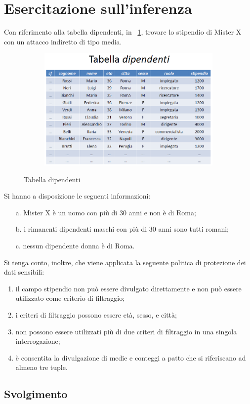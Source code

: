 \section{Esercitazione sull'inferenza}
Con riferimento alla tabella dipendenti, in \figurename ~\ref{fig:Tabella_dipendenti}, trovare lo stipendio di Mister X con un attacco indiretto di tipo media.\\
\begin{figure}[htbp]
	\centering%
	\subfigure%
	{\includegraphics[height=6cm, width=12cm, keepaspectratio]{Immagini/Appendice1/Tabella_dipendenti.png}}
	\caption{Tabella dipendenti\label{fig:Tabella_dipendenti}} 	
\end{figure}
Si hanno a disposizione le seguenti informazioni:
\begin{enumerate}
\item [a.] Mister X è un uomo con più di 30 anni e non è di Roma;
\item [b.] i rimanenti dipendenti maschi con più di 30 anni sono tutti romani;
\item [c.] nessun dipendente donna è di Roma.
\end{enumerate}
Si tenga conto, inoltre, che viene applicata la seguente politica di protezione dei dati sensibili:
\begin{enumerate}
\item il campo stipendio non può essere divulgato direttamente e non può essere utilizzato come criterio di filtraggio;
\item i criteri di filtraggio possono essere età, sesso, e città;
\item non possono essere utilizzati più di due criteri di filtraggio in una singola interrogazione;
\item è consentita la divulgazione di medie e conteggi a patto che si riferiscano ad almeno tre tuple.
\end{enumerate}
\subsection{Svolgimento}
